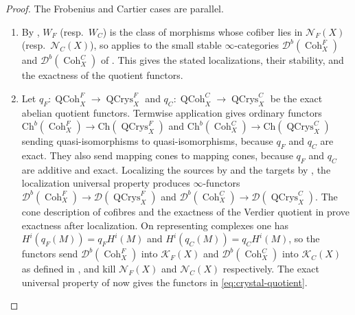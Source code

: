 \documentclass[11pt]{amsart}
\newcommand{\cN}{\mathcal{N}}
\newcommand{\QCoh}{\operatorname{{QCoh}}}
\newcommand{\Coh}{\operatorname{{Coh}}}
\newcommand{\Ch}{\mathrm{Ch}}
\newcommand{\QCrys}{\operatorname{QCrys}}
\newcommand{\Db}{\mathcal D^b}
\newcommand{\KF}{\mathcal K_F}
\newcommand{\KC}{\mathcal K_C}
\theoremstyle{plain}
\theoremstyle{definition}
\numberwithin{equation}{section}
\begin{document}
\begin{proof}
The Frobenius and Cartier cases are parallel.
\begin{enumerate}
\item
By , $W_F$ (resp.\ $W_C$) is the class of morphisms whose cofiber lies in $\cN_F(X)$ (resp.\ $\cN_C(X)$), so \cite[Theorem I.3.3(i)]{NS} applies to the small stable $\infty$-categories $\Db(\Coh^F_X)$ and $\Db(\Coh^C_X)$ of .
This gives the stated localizations, their stability, and the exactness of the quotient functors.
\item
Let $q_F:\QCoh^F_X\to\QCrys^F_X$ and $q_C:\QCoh^C_X\to\QCrys^C_X$ be the exact abelian quotient functors.
Termwise application gives ordinary functors $\Ch^b(\Coh^F_X)\to\Ch(\QCrys^F_X)$ and $\Ch^b(\Coh^C_X)\to\Ch(\QCrys^C_X)$ sending quasi-isomorphisms to quasi-isomorphisms, because $q_F$ and $q_C$ are exact.
They also send mapping cones to mapping cones, because $q_F$ and $q_C$ are additive and exact.
Localizing the sources by  and the targets by \cite[Propositions 1.3.5.13 and 1.3.5.15]{HA}, the localization universal property \cite[\href{https://kerodon.net/tag/01MP}{Tag 01MP}]{Kerodon} produces $\infty$-functors $\Db(\Coh^F_X)\to\mathcal D(\QCrys^F_X)$ and $\Db(\Coh^C_X)\to\mathcal D(\QCrys^C_X)$.
The cone description of cofibres \cite[Remark 1.3.2.17]{HA} and the exactness of the Verdier quotient in  prove exactness after localization.
On representing complexes one has $H^i(q_F(M))=q_F H^i(M)$ and $H^i(q_C(M))=q_C H^i(M)$, so the functors send $\Db(\Coh^F_X)$ into $\KF(X)$ and $\Db(\Coh^C_X)$ into $\KC(X)$ as defined in , and kill $\cN_F(X)$ and $\cN_C(X)$ respectively.
The exact universal property of \cite[Theorem I.3.3(i)]{NS} now gives the functors in \eqref{eq:crystal-quotient}.


\end{enumerate}
\end{proof}
\end{document}
